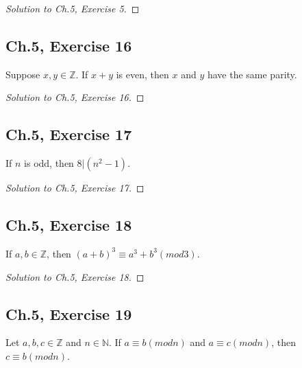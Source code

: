 \documentclass[12pt]{amsart}
\numberwithin{equation}{section}
\theoremstyle{definition}
\theoremstyle{remark}
\begin{document}
\begin{proof}[Solution to Ch.5,  Exercise 5]

\end{proof}




\subsection*{Ch.5,  Exercise 16}  Suppose $ x,y \in \mathbb{Z} $. If $ x + y $ is even, then $ x $ and $ y $ have the same parity.


\begin{proof}[Solution to Ch.5,  Exercise 16]

\end{proof}




\subsection*{Ch.5,  Exercise 17}  If $ n $ is odd, then $ 8 | (n^2 - 1) $.


\begin{proof}[Solution to Ch.5,  Exercise 17]

\end{proof}



\subsection*{Ch.5,  Exercise 18}  If $ a, b \in \mathbb{Z} $, then $ (a + b)^3 \equiv a^3 + b^3 (mod 3) $.



\begin{proof}[Solution to Ch.5,  Exercise 18]

\end{proof}



\subsection*{Ch.5,  Exercise 19}  Let $ a,b,c \in \mathbb{Z} $ and $ n \in \mathbb{N} $. If $ a \equiv b(mod n) $ and $ a \equiv c(mod n) $, then $ c \equiv b(mod n) $.
\end{document}
